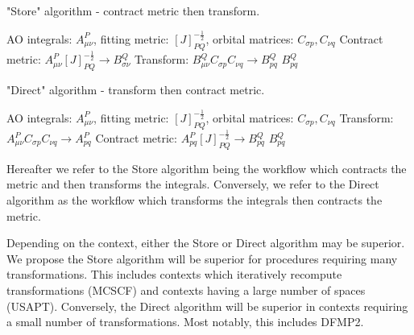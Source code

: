 \begin{algorithm}[H]
\caption{"Store" algorithm - contract metric then transform.}
\begin{algorithmic}
\REQUIRE AO integrals: $A_{\mu \nu}^P$, fitting metric: $[J]_{PQ}^{-\frac{1}{2}}$, orbital matrices: $C_{\sigma p}, C_{\nu q}$
\STATE Contract metric: $A_{\mu \nu}^P [J]_{PQ}^{-\frac{1}{2}} \rightarrow B_{\sigma \nu}^Q$
\STATE Transform: $B_{\mu \nu}^QC_{\sigma p}C_{\nu q} \rightarrow B_{p q}^Q$
\RETURN $B_{p q}^Q$
\end{algorithmic}
\end{algorithm}
\begin{algorithm}

\caption{"Direct" algorithm - transform then contract metric.}
\begin{algorithmic}
\REQUIRE AO integrals: $A_{\mu \nu}^P$, fitting metric: $[J]_{PQ}^{-\frac{1}{2}}$, orbital matrices: $C_{\sigma p}, C_{\nu q}$
\STATE Transform: $A_{\mu \nu}^PC_{\sigma p}C_{\nu q} \rightarrow A_{p q}^P$
\STATE Contract metric: $A_{p q}^P [J]_{PQ}^{-\frac{1}{2}} \rightarrow B_{p q}^Q$
\RETURN $B_{p q}^Q$
\end{algorithmic}
\end{algorithm}

\noindent Hereafter we refer to the Store algorithm being the workflow which contracts the metric and then transforms the integrals. Conversely, 
we refer to the Direct algorithm as the workflow which transforms the integrals then contracts the metric. 

Depending on the context, either the Store or Direct algorithm may be superior. We propose the Store algorithm 
will be superior for procedures requiring
many transformations. This includes contexts which iteratively recompute transformations (MCSCF) and contexts 
having a large number of spaces (USAPT). 
Conversely, the Direct algorithm will be superior in contexts requiring a small number of transformations. Most notably, this includes DFMP2.

%


